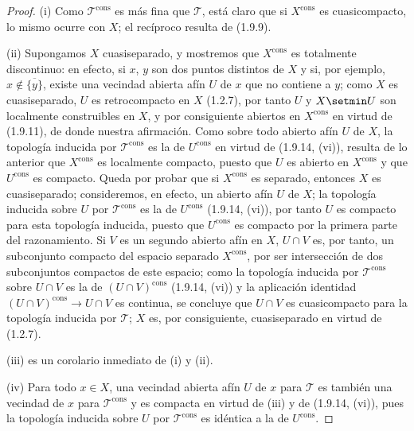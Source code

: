 \begin{proof}
(i) Como $\mathscr T^{\mathrm{cons}}$ es más fina que $\mathscr T$, está
claro que si $X^{\mathrm{cons}}$ es cuasicompacto, lo mismo ocurre con $X$;
el recíproco resulta de (1.9.9).

(ii) Supongamos $X$ cuasiseparado, y mostremos que $X^{\mathrm{cons}}$ es
totalmente discontinuo: en efecto, si $x$, $y$ son dos puntos distintos de
$X$ y si, por ejemplo, $x\notin\overline{\{y\}}$, existe una
vecindad abierta afín $U$ de $x$ que no contiene a $y$; como $X$ es
cuasiseparado, $U$ es retrocompacto en $X$ (1.2.7), por tanto $U$ y $X\setmin U$ son
localmente construibles en $X$, y por consiguiente abiertos en
$X^{\mathrm{cons}}$ en virtud de (1.9.11), de donde nuestra afirmación. Como sobre todo
abierto afín $U$ de $X$, la topología inducida por $\mathscr T^{\mathrm{cons}}$
es la de $U^{\mathrm{cons}}$ en virtud de (1.9.14, (vi)), resulta de lo
anterior que $X^{\mathrm{cons}}$ es localmente compacto, puesto que $U$ es
abierto en $X^{\mathrm{cons}}$ y que $U^{\mathrm{cons}}$ es compacto. Queda por
probar que si $X^{\mathrm{cons}}$ es separado, entonces $X$ es cuasiseparado;
consideremos, en efecto, un abierto afín $U$ de $X$; la topología inducida sobre
$U$ por $\mathscr T^{\mathrm{cons}}$ es la de $U^{\mathrm{cons}}$
(1.9.14, (vi)), por tanto $U$ es compacto para esta topología inducida, puesto que
$U^{\mathrm{cons}}$ es compacto por la primera parte del razonamiento. Si
$V$ es un segundo abierto afín en $X$, $U\cap V$ es, por tanto, un subconjunto
compacto del espacio separado $X^{\mathrm{cons}}$, por ser intersección de dos
subconjuntos compactos de este espacio; como la topología inducida por
$\mathscr T^{\mathrm{cons}}$ sobre $U\cap V$ es la de
$(U\cap V)^{\mathrm{cons}}$ (1.9.14, (vi)) y la aplicación identidad
$(U\cap V)^{\mathrm{cons}}\to U\cap V$ es continua, se concluye que
$U\cap V$ es cuasicompacto para la topología inducida por $\mathscr T$; $X$
es, por consiguiente, cuasiseparado en virtud de (1.2.7).

(iii) es un corolario inmediato de (i) y (ii).

(iv) Para todo $x\in X$, una vecindad abierta afín $U$ de $x$ para
$\mathscr T$ es también una vecindad de $x$ para $\mathscr T^{\mathrm{cons}}$
y es compacta en virtud de (iii) y de (1.9.14, (vi)), pues la topología inducida
sobre $U$ por $\mathscr T^{\mathrm{cons}}$ es idéntica a la de
$U^{\mathrm{cons}}$.


\end{proof}
